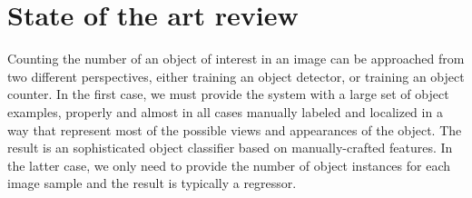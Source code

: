 \newpage
\chapter{State of the art review}
\label{sec:state}

Counting the number of an object of interest in an image can be approached from two different perspectives, either training an object detector, or training an object counter\cite{segui2015learning}. In the first case, we must provide the system with a large set of object examples, properly and almost in all cases manually labeled and localized in a way that represent most of the possible views and appearances of the object. The result is an sophisticated object classifier based on manually-crafted features\cite{viola2004robust, viola2005detecting}. In the latter case, we only need to provide the number of object instances for each image sample and the result is typically a regressor\cite{lempitsky2010learning}. 


